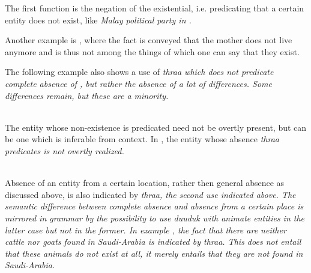 The first function is the negation of the existential, i.e. predicating that a certain entity does not exist, like \em Malay political party \em in .



Another example is , where the fact is conveyed that the mother does not live anymore and is thus not among the things of which one can say that they exist.



 The following example also shows a use of \em thraa \em which does not predicate complete absence of , but rather the absence of a lot of differences. Some differences remain, but these are a minority.


\\

The entity whose non-existence is predicated need not be overtly present, but can be one which is inferable from context. In , the entity whose absence \em thraa \em predicates is not overtly realized.


\\









Absence of an entity from a certain location, rather then general absence as discussed above, is also indicated by \em thraa\em, the second use indicated above. The semantic difference between complete absence and absence from a certain place is mirrored in grammar by the possibility to use \em duuduk \em with animate entities in the latter case but not in the former.
In example , the fact that there are neither cattle nor goats found in Saudi-Arabia is indicated by \em thraa\em. This does not entail that these animals do not exist at all, it merely entails that they are not found in Saudi-Arabia.

